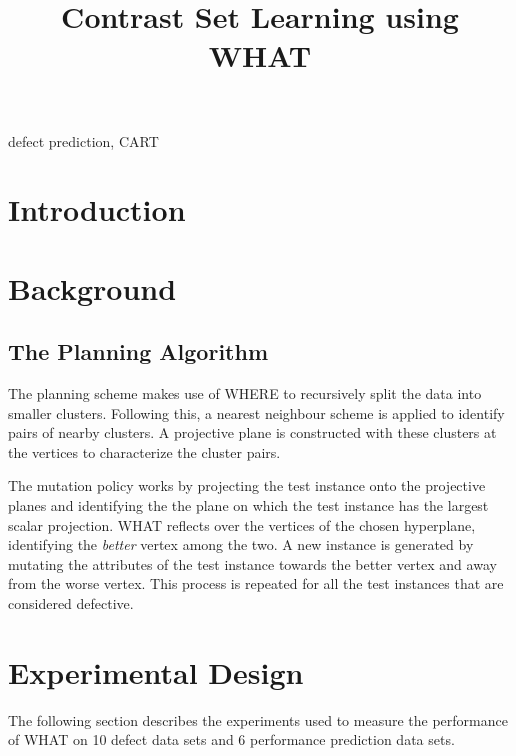 \documentclass[conference]{IEEEtran}
\begin{document}
  \title{Contrast Set Learning using WHAT}
  
  \author{
    \and
    }
  
  \maketitle
  
  
  \begin{abstract}
 
  \end{abstract}
  \begin{IEEEkeywords}
    defect prediction, CART
  \end{IEEEkeywords}
  
\section{Introduction}
\section{Background}
\subsection{The Planning Algorithm}
The planning scheme makes use of WHERE to recursively split the data into smaller clusters. Following this, a nearest neighbour scheme is applied to identify pairs of nearby clusters. A projective plane is constructed with these clusters at the vertices to characterize the cluster pairs.

The mutation policy works by projecting the test instance onto the projective planes and identifying the the plane on which the test instance has the largest scalar projection. WHAT reflects over the vertices of the chosen hyperplane,  identifying the \textit{better} vertex among the two. A new instance is generated by mutating the attributes of the test instance towards the better vertex and away from the worse vertex. This process is repeated for all the test instances that are considered defective.
\section{Experimental Design}
The following section describes the experiments used to measure the performance of WHAT on 10 defect data sets and 6 performance prediction data sets.
\end{document}
